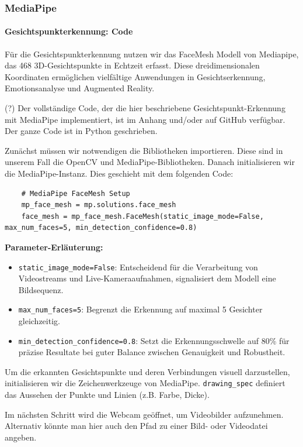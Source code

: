 \subsubsection{MediaPipe}
\paragraph{Gesichtspunkterkennung: Code} 

Für die Gesichtspunkterkennung nutzen wir das FaceMesh Modell von Mediapipe, das 468 3D-Gesichtspunkte in Echtzeit erfasst. Diese dreidimensionalen Koordinaten ermöglichen vielfältige Anwendungen in Gesichtserkennung, Emotionsanalyse und Augmented Reality.

(?) Der vollständige Code, der die hier beschriebene Gesichtspunkt-Erkennung mit MediaPipe implementiert, ist im Anhang und/oder auf GitHub verfügbar.
Der ganze Code ist in Python geschrieben.

Zunächst müssen wir notwendigen die Bibliotheken importieren. Diese sind in unserem Fall die OpenCV und MediaPipe-Bibliotheken.
Danach initialisieren wir die MediaPipe-Instanz. Dies geschieht mit dem folgenden Code:
\begin{lstlisting}
    # MediaPipe FaceMesh Setup
    mp_face_mesh = mp.solutions.face_mesh
    face_mesh = mp_face_mesh.FaceMesh(static_image_mode=False, max_num_faces=5, min_detection_confidence=0.8)
\end{lstlisting}

\textbf{Parameter-Erläuterung:}
\begin{itemize}
    \item \texttt{static\_image\_mode=False}: Entscheidend für die Verarbeitung von Videostreams und Live-Kameraaufnahmen, signalisiert dem Modell eine Bildsequenz.
    \item \texttt{max\_num\_faces=5}: Begrenzt die Erkennung auf maximal 5 Gesichter gleichzeitig.
    \item \texttt{min\_detection\_confidence=0.8}: Setzt die Erkennungsschwelle auf 80\% für präzise Resultate bei guter Balance zwischen Genauigkeit und Robustheit.
\end{itemize}

Um die erkannten Gesichtspunkte und deren Verbindungen visuell darzustellen, initialisieren wir die Zeichenwerkzeuge von MediaPipe. \texttt{drawing\_spec} definiert das Aussehen der Punkte und Linien (z.B. Farbe, Dicke).

Im nächsten Schritt wird die Webcam geöffnet, um Videobilder aufzunehmen. Alternativ könnte man hier auch den Pfad zu einer Bild- oder Videodatei angeben. 

